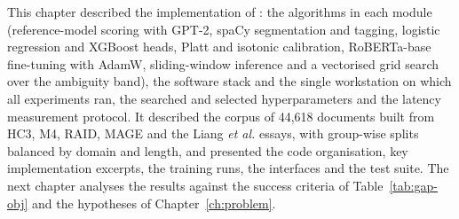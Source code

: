 This chapter described the implementation of \veriscript{}: the algorithms in
each module (reference-model scoring with GPT-2, spaCy segmentation and
tagging, logistic regression and XGBoost heads, Platt and isotonic calibration,
RoBERTa-base fine-tuning with AdamW, sliding-window inference and a vectorised
grid search over the ambiguity band), the software stack and the single
workstation on which all experiments ran, the searched and selected
hyperparameters and the latency measurement protocol. It described the corpus
of 44,618 documents built from HC3, M4, RAID, MAGE and the Liang \textit{et al.}
essays, with group-wise splits balanced by domain and length, and presented the
code organisation, key implementation excerpts, the training runs, the
interfaces and the test suite. The next chapter analyses the results against
the success criteria of Table~\ref{tab:gap-obj} and the hypotheses of
Chapter~\ref{ch:problem}.
